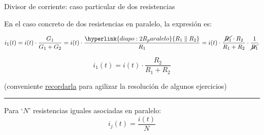 \documentclass[aspectratio=169, xcolor={usenames,svgnames,dvipsnames}]{beamer}
\begin{document}

\begin{frame}{Divisor de corriente: \hspace{3mm} caso particular de dos resistencias}

    \vspace{5mm}
    En el caso concreto de \alert{dos resistencias en paralelo}, la expresión es:
    
    \begin{equation*}
      i_1(t) = i(t) \cdot \frac{G_1}{G_1 + G_2} = i(t) \cdot \frac{\hyperlink{diapo:2R_paralelo}{R_1 \parallel R_2}}{R_1} = i(t) \cdot \frac{\cancel{R_1} \cdot R_2}{R_1 + R_2} \cdot \frac{1}{\cancel{R_1}}
    \end{equation*} %
    
    \begin{equation*}
      \boxed{i_1(t) = i(t) \cdot \frac{R_2}{R_1 + R_2}}
    \end{equation*}
    
    \centering \small{(conveniente \underline{recordarla} para agilizar la resolución de algunos ejercicios)} 

    \vspace{2mm}
    
    \noindent\rule{\textwidth}{0.5pt}

    \vspace{2mm}

    Para `$N$' \alert{resistencias iguales} asociadas en paralelo: 
    \[
        i_j(t) = \frac{i(t)}{N}
    \]
\end{frame}

\end{document}
